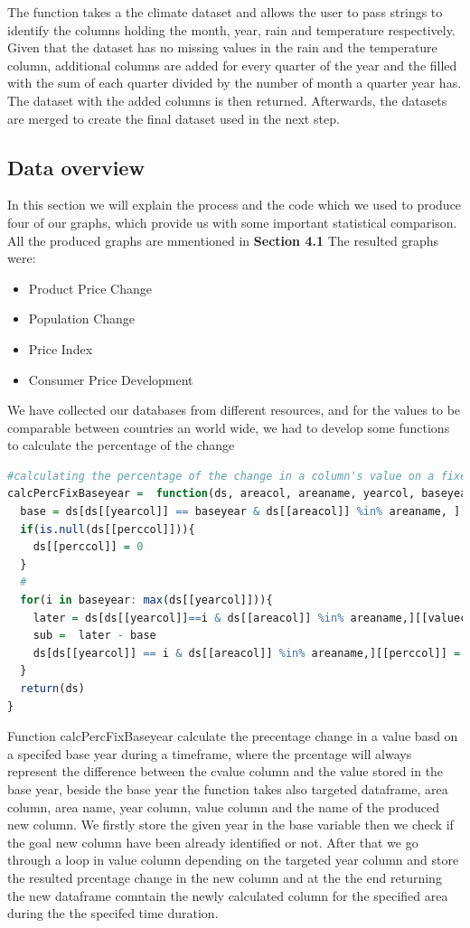 \documentclass[12pt,a4paper,english]{article}
\begin{document}
The function takes a the climate dataset and allows the user to pass strings to identify the columns holding the month, year, rain and temperature respectively. Given that the dataset has no missing values in the rain and the temperature column, additional columns are added for every quarter of the year and the filled with the sum of each quarter divided by the number of month a quarter year has.
The dataset with the added columns is then returned. Afterwards, the datasets are merged to create the final dataset used in the next step.

\subsection{Data overview}

In this section we will explain the process and the code which we used to produce four of our graphs, which provide us with some important statistical comparison. All the produced graphs are mmentioned in \textbf{Section 4.1}
The resulted graphs were: 
\begin{itemize}
\item Product Price Change 
\item Population Change 
\item Price Index 
\item Consumer Price Development 
\end{itemize}

We have collected our databases from different resources, and for the values to be comparable between countries an world wide, we had to develop some functions to calculate the percentage of the change
\begin{lstlisting}[language= R, captionpos=b,caption=\href{https://github.com/jaidikam/sps_ws1718/tree/master/Qfolder7}{SPL\_Q7\_countries\_exploration.R}]
#calculating the percentage of the change in a column's value on a fixed base year 
calcPercFixBaseyear =  function(ds, areacol, areaname, yearcol, baseyear,valuecol, perccol){
  base = ds[ds[[yearcol]] == baseyear & ds[[areacol]] %in% areaname, ][[valuecol]]
  if(is.null(ds[[perccol]])){
    ds[[perccol]] = 0 
  }
  #
  for(i in baseyear: max(ds[[yearcol]])){
    later = ds[ds[[yearcol]]==i & ds[[areacol]] %in% areaname,][[valuecol]]
    sub =  later - base
    ds[ds[[yearcol]] == i & ds[[areacol]] %in% areaname,][[perccol]] = (sub / later) * 100
  }
  return(ds)
}
\end{lstlisting}
Function calcPercFixBaseyear calculate the precentage change in a value basd on a specifed base year during a timeframe, where the prcentage will always represent the difference between the cvalue column and the value stored in the base year, beside the base year the function takes also targeted dataframe,  area column, area name, year column, value column and the name of the produced new column. 
We firstly store the given year in the base variable then we check if the goal new column have been already identified or not. After that we go through a loop in value column depending on the targeted year column and store the resulted prcentage change in the new column and at the the end returning the new dataframe comntain the newly calculated column for the specified area during the the specifed time duration. 
\end{document}
